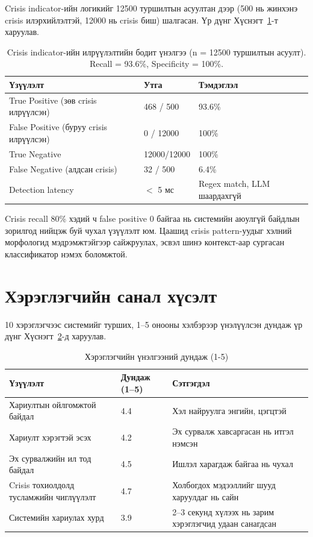 Crisis indicator-ийн логикийг 12500 туршилтын асуултан дээр (500 нь жинхэнэ crisis илэрхийлэлтэй, 12000 нь crisis биш) шалгасан. Үр дүнг Хүснэгт~\ref{tab:crisis-eval}-т харуулав.

\begin{table}[H]
\centering
\begin{tabular}{|p{6.5cm}|p{2.2cm}|p{4.5cm}|}
\hline
\textbf{Үзүүлэлт} & \textbf{Утга} & \textbf{Тэмдэглэл} \\ \hline
True Positive (зөв crisis илрүүлсэн) & 468 / 500 & 93.6\%  \\ \hline
False Positive (буруу crisis илрүүлсэн) & 0 / 12000 &  100\% \\ \hline
True Negative & 12000/12000 & 100\%  \\ \hline
False Negative (алдсан crisis) & 32 / 500 & 6.4\% \\ \hline
Detection latency & $<$ 5 мс & Regex match, LLM шаардахгүй \\ \hline
\end{tabular}
\caption[Crisis detection-ийн үнэлгээ]{Crisis indicator-ийн илрүүлэлтийн бодит үнэлгээ (n = 12500 туршилтын асуулт). Recall = 93.6\%, Specificity = 100\%.}
\label{tab:crisis-eval}
\end{table}

Crisis recall 80\% хэдий ч false positive 0 байгаа нь системийн аюулгүй байдлын зорилгод нийцэж буй чухал үзүүлэлт юм. Цаашид crisis pattern-уудыг хэлний морфологид мэдрэмжтэйгээр сайжруулах, эсвэл шинэ контекст-аар сургасан классификатор нэмэх боломжтой.


\section{Хэрэглэгчийн санал хүсэлт}

10 хэрэглэгчээс системийг турших, 1--5 онооны хэлбэрээр үнэлүүлсэн дундаж үр дүнг Хүснэгт~\ref{tab:user-feedback}-д харуулав.

\begin{table}[H]
\centering
\begin{tabular}{|p{7.0cm}|p{2.0cm}|p{4.2cm}|}
\hline
\textbf{Үзүүлэлт} & \textbf{Дундаж (1--5)} & \textbf{Сэтгэгдэл} \\ \hline
Хариултын ойлгомжтой байдал & 4.4 & Хэл найруулга энгийн, цэгцтэй \\ \hline
Хариулт хэрэгтэй эсэх & 4.2 & Эх сурвалж хавсаргасан нь итгэл нэмсэн \\ \hline
Эх сурвалжийн ил тод байдал & 4.5 & Ишлэл харагдаж байгаа нь чухал \\ \hline
Crisis тохиолдолд тусламжийн чиглүүлэлт & 4.7 & Холбогдох мэдээллийг шууд харуулдаг нь сайн \\ \hline
Системийн хариулах хурд & 3.9 & 2--3 секунд хүлээх нь зарим хэрэглэгчид удаан санагдсан \\ \hline
\end{tabular}
\caption[Хэрэглэгчийн санал хүсэлт]{Хэрэглэгчийн үнэлгээний дундаж (1-5)}
\label{tab:user-feedback}
\end{table}

